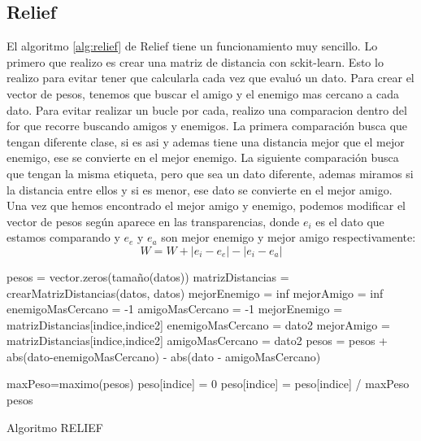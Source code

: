 \documentclass[12pt,a4paper]{article}
\begin{document}
\subsection{Relief}
El algoritmo \ref{alg:relief} de Relief tiene un funcionamiento muy sencillo. Lo primero que realizo es crear una matriz de distancia con sckit-learn\cite{Baz}. Esto lo realizo para  evitar tener que calcularla cada vez que evaluó un dato. Para crear el vector de pesos, tenemos que buscar el amigo y el enemigo mas cercano a cada dato. Para evitar realizar un bucle por cada, realizo una comparacion dentro del for que recorre buscando amigos y enemigos. La primera comparación busca que tengan diferente clase, si es asi y ademas tiene una distancia mejor que el mejor enemigo, ese se convierte en el mejor enemigo. La siguiente comparación busca que tengan la misma etiqueta, pero que sea un dato diferente, ademas miramos si la distancia entre ellos  y si es menor, ese dato se convierte en el mejor amigo.\\
Una vez que hemos encontrado el mejor amigo y enemigo, podemos modificar el vector de pesos según aparece en las transparencias, donde $e_i$ es el dato que estamos comparando y $e_e$ y $e_a$ son mejor enemigo y mejor amigo respectivamente:
\[ W=W+\left|e_{i}-e_{e}\right|-\left|e_{i}-e_{a}\right| \]
\begin{algorithm}[H]
	\begin{algorithmic}[1]
		\State 	pesos = vector.zeros(tamaño(datos))
		\State matrizDistancias = crearMatrizDistancias(datos, datos)
			\State mejorEnemigo = inf
			\State mejorAmigo = inf
			\State enemigoMasCercano = -1
			\State amigoMasCercano = -1
						\State mejorEnemigo = matrizDistancias[indice,indice2]
						\State enemigoMasCercano = dato2
					\EndIf %
				\EndIf %
						\State mejorAmigo = matrizDistancias[indice,indice2]
						\State amigoMasCercano = dato2
					\EndIf %
				\EndIf %
			\EndFor
			\State pesos = pesos + abs(dato-enemigoMasCercano) - abs(dato - amigoMasCercano)
			
		\EndFor
		\State maxPeso=maximo(pesos)
				\State peso[indice] = 0
			\Else
				\State peso[indice] = peso[indice] / maxPeso
			\EndIf
		\EndFor
		\State \Return pesos
		
	\end{algorithmic}
	\label{alg:relief}
	\caption{Algoritmo RELIEF}
\end{algorithm}
\end{document}
